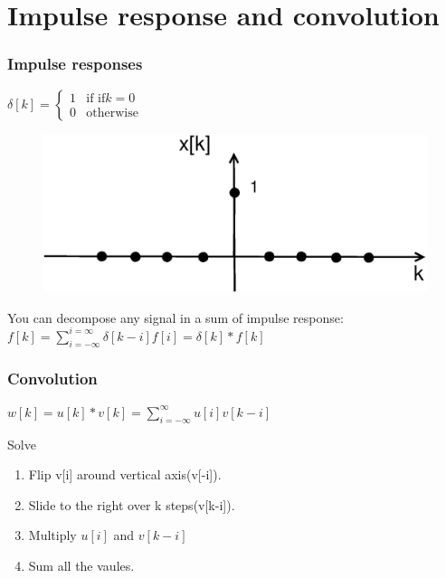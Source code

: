 \section{Impulse response and convolution}
\begin{frame}
	\frametitle{Impulse responses }
	
	\begin{definition}
		\footnotesize{
		$\delta[k]=
		\begin{cases} 
			1 &\mbox{if } \text{if} k = 0 \\ 
			0 & \mbox{otherwise}  
		\end{cases}$}
	\end{definition}
	\vspace{-1em}
		\begin{figure}
			\centering
			\includegraphics[width=0.45\linewidth]{Images/Discrete_time_eps_8.eps}
		\end{figure}
		\vspace{-1em}
\begin{theorem}
	\scriptsize{
	You can decompose any signal in a sum of impulse response:\\
	$f[k]=\sum\limits_{i=-\infty}^{i=\infty}\delta[k-i]f[i] = \delta[k] \ast f[k]$}
\end{theorem}
\end{frame}
\begin{frame}
	\frametitle{Convolution}
	\begin{definition}
		$w[k]=u[k]\ast v[k] = \sum\limits_{i=-\infty}^{\infty} u[i]v[k-i]$
	\end{definition}
	\begin{block}{Solve}
		\begin{enumerate}
			\item Flip v[i] around vertical axis(v[-i]).
			\item Slide to the right over k steps(v[k-i]).
			\item Multiply $u[i]$ and $v[k-i]$
			\item Sum all the vaules.
		\end{enumerate}
	\end{block}
\end{frame}
